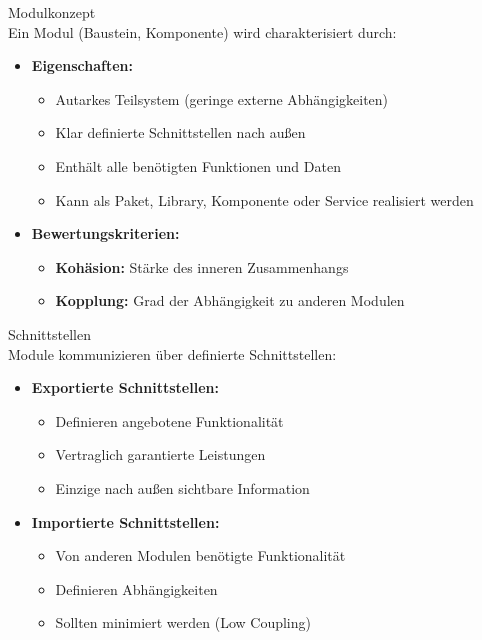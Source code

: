 \begin{concept}{Modulkonzept}\\
Ein Modul (Baustein, Komponente) wird charakterisiert durch:

\begin{itemize}
    \item \textbf{Eigenschaften:}
    \begin{itemize}
        \item Autarkes Teilsystem (geringe externe Abhängigkeiten)
        \item Klar definierte Schnittstellen nach außen
        \item Enthält alle benötigten Funktionen und Daten
        \item Kann als Paket, Library, Komponente oder Service realisiert werden
    \end{itemize}
    
    \item \textbf{Bewertungskriterien:}
    \begin{itemize}
        \item \textbf{Kohäsion:} Stärke des inneren Zusammenhangs
        \item \textbf{Kopplung:} Grad der Abhängigkeit zu anderen Modulen
    \end{itemize}
\end{itemize}
\end{concept}

\begin{definition}{Schnittstellen}\\
Module kommunizieren über definierte Schnittstellen:

\begin{itemize}
    \item \textbf{Exportierte Schnittstellen:}
    \begin{itemize}
        \item Definieren angebotene Funktionalität
        \item Vertraglich garantierte Leistungen
        \item Einzige nach außen sichtbare Information
    \end{itemize}
    
    \item \textbf{Importierte Schnittstellen:}
    \begin{itemize}
        \item Von anderen Modulen benötigte Funktionalität
        \item Definieren Abhängigkeiten
        \item Sollten minimiert werden (Low Coupling)
    \end{itemize}
\end{itemize}
\end{definition}

